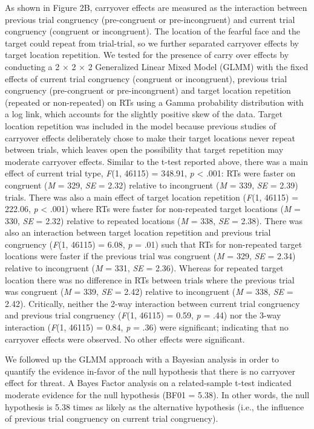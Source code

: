 \documentclass{article}
\begin{document}
As shown in Figure 2B, carryover effects are measured as the interaction between previous trial congruency (pre-congruent or pre-incongruent) and current trial congruency (congruent or incongruent). The location of the fearful face and the target could repeat from trial-trial, so we further separated carryover effects by target location repetition. We tested for the presence of carry over effects by conducting a 2 × 2 × 2 Generalized Linear Mixed Model (GLMM) with the fixed effects of current trial congruency (congruent or incongruent), previous trial congruency (pre-congruent or pre-incongruent) and target location repetition (repeated or non-repeated) on RTs using a Gamma probability distribution with a log link, which accounts for the slightly positive skew of the data. Target location repetition was included in the model because previous studies of carryover effects deliberately chose to make their target locations never repeat between trials, \parencite{Gladwin2019} which leaves open the possibility that target repetition may moderate carryover effects. Similar to the t-test reported above, there was a main effect of current trial type, \emph{F}(1, 46115) = 348.91, \emph{p }< .001: RTs were faster on congruent (\emph{M }= 329, \emph{SE }= 2.32) relative to incongruent (\emph{M }= 339, \emph{SE }= 2.39) trials. There was also a main effect of target location repetition (\emph{F}(1, 46115) = 222.06, \emph{p }< .001) where RTs were faster for non-repeated target locations (\emph{M }= 330, \emph{SE }= 2.32) relative to repeated locations (\emph{M }= 338, \emph{SE }= 2.38). There was also an interaction between target location repetition and previous trial congruency (\emph{F}(1, 46115) = 6.08, \emph{p }= .01) such that RTs for non-repeated target locations were faster if the previous trial was congruent (\emph{M }= 329, \emph{SE }= 2.34) relative to incongruent (\emph{M }= 331, \emph{SE }= 2.36). Whereas for repeated target location there was no difference in RTs between trials where the previous trial was congruent (\emph{M }= 339, \emph{SE }= 2.42) relative to incongruent (\emph{M }= 338, \emph{SE }= 2.42). Critically, neither the 2-way interaction between current trial congruency and previous trial congruency (\emph{F}(1, 46115) = 0.59, \emph{p }= .44) nor the 3-way interaction (\emph{F}(1, 46115) = 0.84, \emph{p }= .36) were significant; indicating that no carryover effects were observed. No other effects were significant.

We followed up the GLMM approach with a Bayesian analysis in order to quantify the evidence in-favor of the null hypothesis that there is no carryover effect for threat. A Bayes Factor analysis on a related-sample t-test indicated moderate evidence for the null hypothesis (BF01 = 5.38). In other words, the null hypothesis is 5.38 times as likely as the alternative hypothesis (i.e., the influence of previous trial congruency on current trial congruency). 
\end{document}
